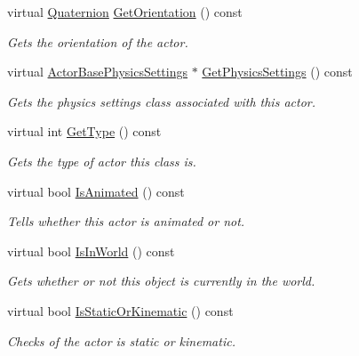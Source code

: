 \begin{DoxyCompactItemize}
virtual \hyperlink{classphys_1_1Quaternion}{Quaternion} \hyperlink{classphys_1_1ActorBase_ad5e1df2fd1fcd6b795e499c6e39bd336}{GetOrientation} () const 
\begin{DoxyCompactList}\small\item\em Gets the orientation of the actor. \item\end{DoxyCompactList}\item 
virtual \hyperlink{classphys_1_1ActorBasePhysicsSettings}{ActorBasePhysicsSettings} $\ast$ \hyperlink{classphys_1_1ActorBase_ab320de95c769822766207e20ac2cd16d}{GetPhysicsSettings} () const 
\begin{DoxyCompactList}\small\item\em Gets the physics settings class associated with this actor. \item\end{DoxyCompactList}\item 
virtual int \hyperlink{classphys_1_1ActorBase_ac631b0572fbcac6ac6dee3b0a8704c8e}{GetType} () const 
\begin{DoxyCompactList}\small\item\em Gets the type of actor this class is. \item\end{DoxyCompactList}\item 
virtual bool \hyperlink{classphys_1_1ActorBase_a111d95076bf455fd3d4c68d27c8b0db4}{IsAnimated} () const 
\begin{DoxyCompactList}\small\item\em Tells whether this actor is animated or not. \item\end{DoxyCompactList}\item 
virtual bool \hyperlink{classphys_1_1ActorBase_a8bab6e57c5919042841a2abf6a222613}{IsInWorld} () const 
\begin{DoxyCompactList}\small\item\em Gets whether or not this object is currently in the world. \item\end{DoxyCompactList}\item 
virtual bool \hyperlink{classphys_1_1ActorBase_a3c788bba177b0a31f3701b05718be73c}{IsStaticOrKinematic} () const 
\begin{DoxyCompactList}\small\item\em Checks of the actor is static or kinematic. \item\end{DoxyCompactList}\item 

\end{DoxyCompactItemize}
